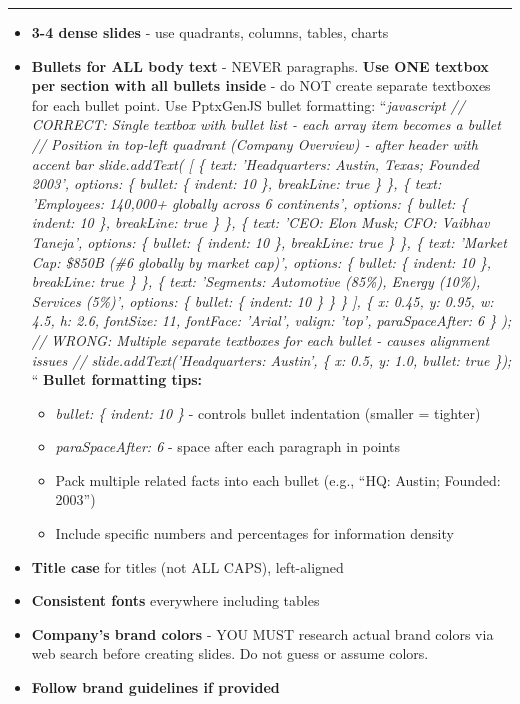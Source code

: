 \documentclass[11pt]{article}
\begin{document}
\vspace{0.5em}\hrule\vspace{0.5em}

\begin{itemize}[leftmargin=*,itemsep=2pt,topsep=2pt]
\item {} \textbf{3-4 dense slides} - use quadrants, columns, tables, charts
\item {} \textbf{Bullets for ALL body text} - NEVER paragraphs. \textbf{Use ONE textbox per section with all bullets inside} - do NOT create separate textboxes for each bullet point. Use PptxGenJS bullet formatting: ``\emph{javascript // CORRECT: Single textbox with bullet list - each array item becomes a bullet // Position in top-left quadrant (Company Overview) - after header with accent bar slide.addText( [ \{ text: 'Headquarters: Austin, Texas; Founded 2003', options: \{ bullet: \{ indent: 10 \}, breakLine: true \} \}, \{ text: 'Employees: 140,000+ globally across 6 continents', options: \{ bullet: \{ indent: 10 \}, breakLine: true \} \}, \{ text: 'CEO: Elon Musk; CFO: Vaibhav Taneja', options: \{ bullet: \{ indent: 10 \}, breakLine: true \} \}, \{ text: 'Market Cap: \$850B (\#6 globally by market cap)', options: \{ bullet: \{ indent: 10 \}, breakLine: true \} \}, \{ text: 'Segments: Automotive (85\%), Energy (10\%), Services (5\%)', options: \{ bullet: \{ indent: 10 \} \} \} ], \{ x: 0.45, y: 0.95, w: 4.5, h: 2.6, fontSize: 11, fontFace: 'Arial', valign: 'top', paraSpaceAfter: 6 \} ); // WRONG: Multiple separate textboxes for each bullet - causes alignment issues // slide.addText('Headquarters: Austin', \{ x: 0.5, y: 1.0, bullet: true \}); }`` \textbf{Bullet formatting tips:}
\begin{itemize}[leftmargin=*,itemsep=2pt,topsep=2pt]
\item {} \emph{bullet: \{ indent: 10 \}} - controls bullet indentation (smaller = tighter)
\item {} \emph{paraSpaceAfter: 6} - space after each paragraph in points
\item {} Pack multiple related facts into each bullet (e.g., ``HQ: Austin; Founded: 2003'')
\item {} Include specific numbers and percentages for information density
\end{itemize}
\item {} \textbf{Title case} for titles (not ALL CAPS), left-aligned
\item {} \textbf{Consistent fonts} everywhere including tables
\item {} \textbf{Company's brand colors} - YOU MUST research actual brand colors via web search before creating slides. Do not guess or assume colors.
\item {} \textbf{Follow brand guidelines if provided}
\end{itemize}
\end{document}
